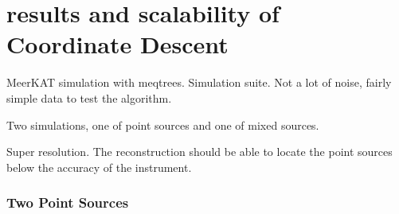 \section{results and scalability of Coordinate Descent}


MeerKAT simulation with meqtrees. Simulation suite. Not a lot of noise, fairly simple data to test the algorithm.

Two simulations, one of point sources and one of mixed sources. 

Super resolution. The reconstruction should be able to locate the point sources below the accuracy of the instrument.

\subsubsection{Two Point Sources}


